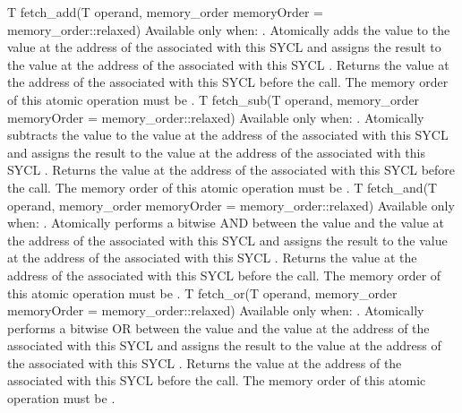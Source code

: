   \addRowTwoL
    { T fetch_add(T operand, memory_order memoryOrder = }
    { memory_order::relaxed) }
    {
      Available only when: .
      \newline
      Atomically adds the value  to the value at the address
      of the  associated with this SYCL  and assigns the result to the value at the address of the
       associated with this SYCL .
      Returns the value at the address of the  associated
      with this SYCL  before the call. The memory order of
      this atomic operation must be .
    }
  \addRowTwoL
    { T fetch_sub(T operand, memory_order memoryOrder = }
    { memory_order::relaxed) }
    {
      Available only when: .
      \newline
      Atomically subtracts the value  to the value at the
      address of the  associated with this SYCL
       and assigns the result to the value at the address of
      the  associated with this SYCL .
      Returns the value at the address of the  associated
      with this SYCL  before the call. The memory order of
      this atomic operation must be .
    }
  \addRowTwoL
    { T fetch_and(T operand, memory_order memoryOrder = }
    { memory_order::relaxed) }
    {
      Available only when: .
      \newline
      Atomically performs a bitwise AND between the value 
      and the value at the address of the  associated with
      this SYCL  and assigns the result to the value at the
      address of the  associated with this SYCL
      . Returns the value at the address of the  associated with this SYCL  before the call.
      The memory order of this atomic operation must be .
    }
  \addRowTwoL
    { T fetch_or(T operand, memory_order memoryOrder = }
    { memory_order::relaxed) }
    {
      Available only when: .
      \newline
      Atomically performs a bitwise OR between the value 
      and the value at the address of the  associated with
      this SYCL  and assigns the result to the value at the
      address of the  associated with this SYCL
      . Returns the value at the address of the  associated with this SYCL  before the call.
      The memory order of this atomic operation must be .
    }
